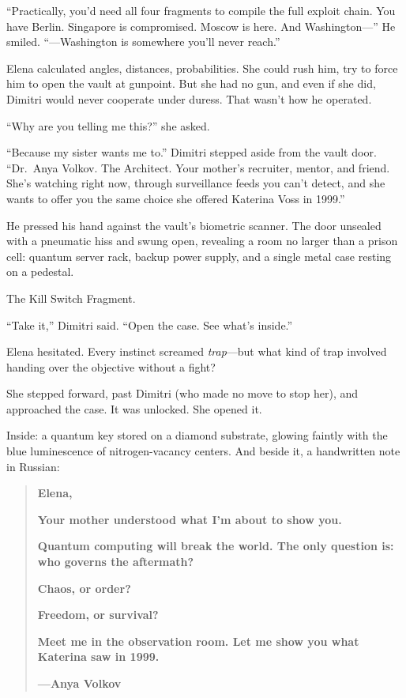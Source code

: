 ``Practically, you'd need all four fragments to compile the full exploit chain. You have Berlin. Singapore is compromised. Moscow is here. And Washington---'' He smiled. ``---Washington is somewhere you'll never reach.''

Elena calculated angles, distances, probabilities. She could rush him, try to force him to open the vault at gunpoint. But she had no gun, and even if she did, Dimitri would never cooperate under duress. That wasn't how he operated.

``Why are you telling me this?'' she asked.

``Because my sister wants me to.'' Dimitri stepped aside from the vault door. ``Dr.~Anya Volkov. The Architect. Your mother's recruiter, mentor, and friend. She's watching right now, through surveillance feeds you can't detect, and she wants to offer you the same choice she offered Katerina Voss in 1999.''

He pressed his hand against the vault's biometric scanner. The door unsealed with a pneumatic hiss and swung open, revealing a room no larger than a prison cell: quantum server rack, backup power supply, and a single metal case resting on a pedestal.

The Kill Switch Fragment.

``Take it,'' Dimitri said. ``Open the case. See what's inside.''

Elena hesitated. Every instinct screamed \emph{trap}---but what kind of trap involved handing over the objective without a fight?

She stepped forward, past Dimitri (who made no move to stop her), and approached the case. It was unlocked. She opened it.

Inside: a quantum key stored on a diamond substrate, glowing faintly with the blue luminescence of nitrogen-vacancy centers. And beside it, a handwritten note in Russian:

\begin{quote}
\textbf{Elena,}

\textbf{Your mother understood what I'm about to show you.}

\textbf{Quantum computing will break the world. The only question is: who governs the aftermath?}

\textbf{Chaos, or order?}

\textbf{Freedom, or survival?}

\textbf{Meet me in the observation room. Let me show you what Katerina saw in 1999.}

\textbf{---Anya Volkov}
\end{quote}

